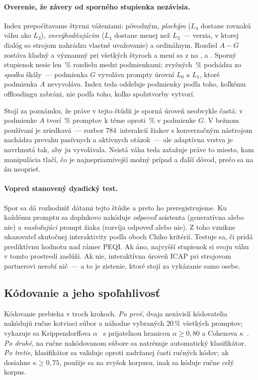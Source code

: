 \paragraph{Overenie, že závery od sporného stupienka nezávisia.} Index prepočítavame štyrmi váženiami: pôvodným, \emph{plochým} ($L_4$ dostane rovnakú váhu ako $L_3$), \emph{znevýhodňujúcim} ($L_4$ dostane menej než $L_3$~--- verzia, v ktorej dialóg so strojom nahrádza vlastné uvažovanie) a ordinálnym. Rozdiel $A-G$ zostáva kladný a významný pri všetkých štyroch a mení sa z \icapGapStd{} na \icapGapFlat, \icapGapDem{} a \icapGapOrd. Sporný stupienok nesie len \icapRungShare\,\% rozdielu medzi podmienkami; zvyšných \icapRestShare\,\% pochádza zo \emph{spodku} škály~--- podmienka $G$ vyvoláva prompty úrovní $L_0$ a $L_1$, ktoré podmienka $A$ nevyvoláva. Index teda oddeľuje podmienky podľa toho, koľkému offloadingu zabráni, nie podľa toho, koľko spolutvorby vytvorí.

Stojí za poznámku, že práve v tejto štúdii je sporná úroveň neobvykle častá: v podmienke $A$ tvorí \icapLfourA\,\% promptov k téme oproti \icapLfourG\,\% v podmienke $G$. V bežnom používaní je zriedkavá~--- rozbor 784~interakcií žiakov s konverzačným nástrojom nachádza prevahu pasívnych a aktívnych otázok~--- ale adaptívna vrstva je navrhnutá tak, aby ju vyvolávala. Neistá váha teda zaťažuje práve to miesto, kam manipulácia tlačí, čo je najnepriaznivejší možný prípad a ďalší dôvod, prečo sa na ňu neoprieť.

\paragraph{Vopred stanovený dyadický test.} Spor sa dá rozhodnúť dátami tejto štúdie a preto ho preregistrujeme. Ku každému promptu sa doplnkovo nakóduje \emph{odpoveď} asistenta (generatívna alebo nie) a \emph{nasledujúci} prompt žiaka (rozvíja odpoveď alebo nie). Z toho vznikne ukazovateľ skutočnej interaktivity podľa oboch Chiho kritérií. Testuje sa, či pridá prediktívnu hodnotu nad rámec PEQI. Ak áno, najvyšší stupienok si svoju váhu v tomto prostredí zaslúži. Ak nie, interaktívna úroveň ICAP pri strojovom partnerovi nerobí nič~--- a to je zistenie, ktoré stojí za vykázanie samo osebe.

\subsection{Kódovanie a jeho spoľahlivosť}

Kódovanie prebieha v troch krokoch. \emph{Po prvé}, dvaja nezávislí kódovatelia nakódujú ručne kotviaci súbor a náhodne vybraných 20\,\% všetkých promptov; vykazuje sa Krippendorffova $\alpha$~\cite{krippendorff2004content} s prijateľnou hranicou $\alpha\geq0{,}80$ a Cohenova $\kappa$~\cite{landis1977kappa}. \emph{Po druhé}, na ručne nakódovanom súbore sa natrénuje automatický klasifikátor. \emph{Po tretie}, klasifikátor sa validuje oproti zadržanej časti ručných kódov; ak dosiahne $\kappa\geq0{,}75$, použije sa na zvyšok korpusu, inak sa kóduje ručne celý korpus.

